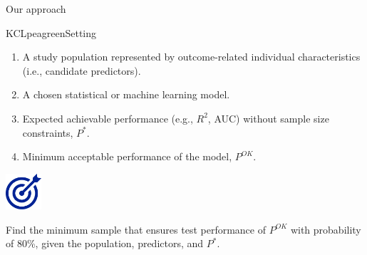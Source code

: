 \documentclass[11pt]{beamer}
\newcommand{\bgap}{\vspace{0.8em}}
\begin{document}
\begin{frame}[t]{Our approach}

	\begin{cbox}{KCLpeagreen}{Setting}
		\begin{enumerate}
			\setlength{\itemsep}{7pt}
			\item A study population represented by outcome-related individual
			      characteristics (i.e., candidate predictors).
			\item A chosen statistical or machine learning model.
			\item Expected achievable performance (e.g., $R^2$, AUC) without
			      sample size constraints, $P^{*}$.
			\item Minimum acceptable performance of the model, $P^{OK}$.
		\end{enumerate}
	\end{cbox}

	\bgap
	\centering
	\includegraphics[height=3.6em]{figures/target.pdf}
	\hspace{0.7em}
	\large
	\parbox[b]{0.8\textwidth}{ \raggedright \textcolor{KCLpantone}{ Find the
	    minimum sample that ensures test performance of $P^{OK}$ with
	    probability of 80\%, given the population, predictors, and $P^{*}$. }
	    }


\end{frame}
\end{document}

